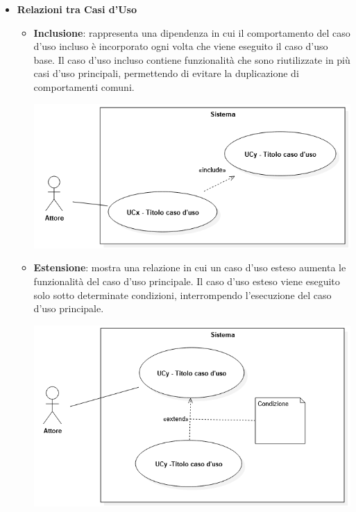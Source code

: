 \begin{itemize}
	\item \textbf{Relazioni tra Casi d'Uso}
	    \begin{itemize}
		    \item \textbf{Inclusione}: rappresenta una dipendenza in cui il comportamento del caso d'uso incluso è incorporato ogni volta che viene eseguito il caso d'uso base. Il caso d'uso incluso contiene funzionalità che sono riutilizzate in più casi d'uso principali, permettendo di evitare la duplicazione di comportamenti comuni. 
				\begin{center}
					\includegraphics*[width=15cm]{../../../images/norme_di_progetto/inclusione.png}
				\end{center} 
		\newpage
		\item \textbf{Estensione}: mostra una relazione in cui un caso d'uso esteso aumenta le funzionalità del caso d'uso principale. Il caso d'uso esteso viene eseguito solo sotto determinate condizioni, interrompendo l'esecuzione del caso d'uso principale.
		\begin{center}
					\includegraphics*[width=15cm]{../../../images/norme_di_progetto/estensione.png}

\end{center}
\end{itemize}
\end{itemize}
